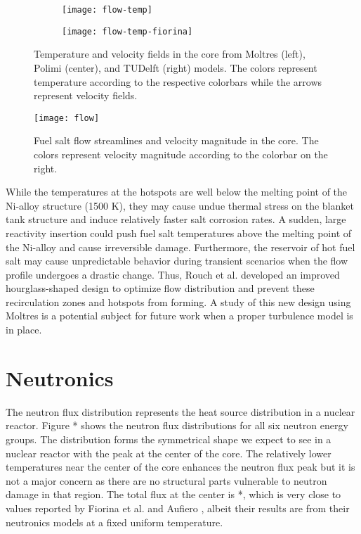 \begin{figure}[htb!]
    \centering
    \begin{subfigure}[t]{.37\textwidth}
        \centering
        \texttt{[image: flow-temp]}
    \end{subfigure}
    \hfill
    \begin{subfigure}[t]{.625\textwidth}
        \centering
        \texttt{[image: flow-temp-fiorina]}
    \end{subfigure}
    \caption{Temperature and velocity fields in the core from Moltres
    (left), Polimi (center), and TUDelft (right) models. The colors represent
    temperature according to the respective colorbars while the arrows
    represent velocity fields.}
    \label{fig:flow-temp}
\end{figure}

\begin{figure}[htb!]
    \centering
    \texttt{[image: flow]}
    \caption{Fuel salt flow streamlines and velocity magnitude in the core.
    The colors represent velocity magnitude according to the colorbar on the
    right.}
    \label{fig:flow}
\end{figure}

While the temperatures at the hotspots are well below the melting point of the
Ni-alloy structure (1500 K), they may cause undue thermal stress on the
blanket tank structure and induce relatively faster salt corrosion rates. A
sudden, large reactivity insertion could push fuel salt temperatures above the
melting point of the Ni-alloy and cause irreversible damage. Furthermore,
the reservoir of hot fuel salt may cause unpredictable behavior during
transient scenarios when the flow profile undergoes a drastic change.
Thus, Rouch et al. \cite{rouch_preliminary_2014} developed an improved
hourglass-shaped design to optimize flow distribution and prevent these
recirculation zones and hotspots from forming. A study of this new design
using Moltres is a potential subject for future work when a proper turbulence
model is in place.

\section{Neutronics}

The neutron flux distribution represents the heat source distribution in a
nuclear reactor. Figure * shows the neutron flux distributions for all six
neutron energy groups. The distribution forms the symmetrical shape we expect
to see in a nuclear reactor with the peak at the center of the core. The
relatively lower temperatures near the center of the core enhances the neutron
flux peak but it is not a major concern as there are no structural parts
vulnerable to neutron damage in that region. The total flux at the center is
*, which is very close to values reported by Fiorina et al. 
\cite{fiorina_molten_2013} and Aufiero \cite{aufiero_development_2014}, albeit
their results are from their neutronics models at a fixed uniform temperature.

